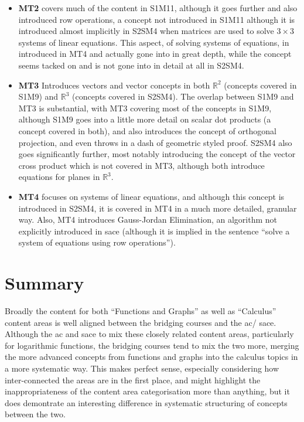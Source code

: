 \documentclass[twoside,12pt,a4paper]{report}
\begin{document}
\begin{itemize}
	\item \textbf{MT2} covers much of the content in S1M11, although it goes further and also introduced row operations, a concept not introduced in S1M11 although it is introduced almost implicitly in S2SM4 when matrices are used to solve $3 \times 3$ systems of linear equations. This aspect, of solving systems of equations, in introduced in MT4 and actually gone into in great depth, while the concept seems tacked on and is not gone into in detail at all in S2SM4.
	\item \textbf{MT3} Introduces vectors and vector concepts in both $\mathbb{R}^2$ (concepts covered in S1M9) and $\mathbb{R}^3$ (concepts covered in S2SM4). The overlap between S1M9 and MT3 is substantial, with MT3 covering most of the concepts in S1M9, although S1M9 goes into a little more detail on scalar dot products (a concept covered in both), and also introduces the concept of orthogonal projection, and even throws in a dash of geometric styled proof. S2SM4 also goes significantly further, most notably introducing the concept of the vector cross product which is not covered in MT3, although both introduce equations for planes in $\mathbb{R}^3$.
	\item \textbf{MT4} focuses on systems of linear equations, and although this concept is introduced in S2SM4, it is covered in MT4 in a much more detailed, granular way. Also, MT4 introduces Gauss-Jordan Elimination, an algorithm not explicitly introduced in \gls{sace} (although it is implied in the sentence ``solve a system of equations using row operations'').
\end{itemize}







\section{Summary}

Broadly the content for both ``Functions and Graphs'' as well as ``Calculus'' content areas is well aligned between the bridging courses and the \gls{ac}/ \gls{sace}. Although the \gls{ac} and \gls{sace} to mix these closely related content areas, particularly for logarithmic functions, the bridging courses tend to mix the two more, merging the more advanced concepts from functions and graphs into the calculus topics in a more systematic way. This makes perfect sense, especially considering how inter-connected the areas are in the first place, and might highlight the inappropriateness of the content area categorisation more than anything, but it does demontrate an interesting difference in systematic structuring of concepts between the two. 
\end{document}
